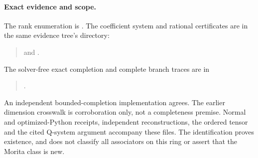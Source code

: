 \paragraph{Exact evidence and scope.}
The rank enumeration is
.
The coefficient system and rational certificates are in the same evidence
tree's  directory:
\begin{quote}\small
{}\quad and\quad
{}.
\end{quote}
The solver-free exact completion and complete branch traces are in
\begin{quote}\small{}.\end{quote}
An independent bounded-completion implementation agrees. The earlier
dimension crosswalk is corroboration only, not a completeness premise.
Normal and optimized-Python receipts, independent reconstructions, the
ordered tensor and the cited Q-system argument accompany these files.
The identification proves existence, and does not classify all associators
on this ring or assert that the Morita class is new.
